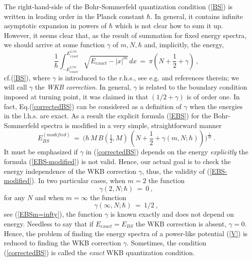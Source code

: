 \documentclass[preprint,preprintnumbers,amsmath,amssymb]{revtex4}
\begin{document}
The right-hand-side of the Bohr-Sommerfeld quantization condition (\ref{BS}) is written in leading order in the Planck constant $\hbar$. In general, it contains infinite asymptotic expansion in powers of $\hbar$ which is not clear how to sum it up. However, it seems clear that, as the result of summation for fixed energy spectra, we should arrive at some function $\gamma$ of $m,N,\hbar$ and, implicitly, the energy,
\begin{equation}
 \frac{1}{\hbar} \int_{-E_{exact}^{1/m}}^{E_{exact}^{1/m}}\sqrt{E_{exact}-|x|^m}\,dx\ =\ \pi\left(N+\frac{1}{2}+\gamma\right)\ ,
\label{correctedBS}
\end{equation}
cf.(\ref{BS}), where $\gamma$ is introduced to the r.h.s., see e.g. \cite{Voros:1999} and references therein; we will call $\gamma$ the {\it WKB correction}. In general, $\gamma$ is related to the boundary condition imposed at turning point, it was claimed in \cite{LL} that $(1/2+\gamma)$ is of order one. In fact, Eq.(\ref{correctedBS}) can be considered as a definition of $\gamma$ when the energies in the l.h.s. are exact. As a result the explicit formula (\ref{EBS}) for the Bohr-Sommerfeld spectra is modified in a very simple, straightforward  manner
\begin{equation}
\label{EBS-modified}
		E^{(modified)}_{BS}\ =\ \bigg({\hbar}\,M\,B\left(\tfrac{1}{2},M\right)\,
		\left(N+\frac{1}{2}+\gamma(m,N;\hbar)\right)\bigg)^{\frac{1}{M}}\ .
\end{equation}
It must be emphasized if $\gamma$ in (\ref{correctedBS}) depends on the energy {\it explicitly} the formula (\ref{EBS-modified}) is not valid. Hence, our actual goal is to check the energy independence of the WKB correction $\gamma$, thus, the validity of (\ref{EBS-modified}). In two particular cases, when $m=2$ the function $$\gamma(2,N;\hbar)\ =\ 0\ ,$$ for any $N$ and when $m=\infty$ the function $$\gamma(\infty,N;\hbar)\ =\ 1/2\ ,$$ see (\ref{EBSm=infty}), the function $\gamma$ is known exactly and does not depend on energy. Needless to say that if $E_{exact}=E_{BS}$ the WKB correction is absent, $\gamma=0$.
Hence, the problem of finding the energy spectra of a power-like potential (\ref{V}) is reduced to
finding the WKB correction $\gamma$. Sometimes, the condition (\ref{correctedBS}) is called the
{\it exact} WKB quantization condition.
\end{document}
